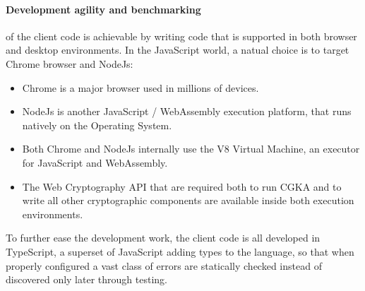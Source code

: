 \paragraph{Development agility and benchmarking} of the client code is achievable by writing code that is supported in both browser and desktop environments.
In the JavaScript world, a natual choice is to target Chrome browser and NodeJs:
\begin{itemize}
    \item Chrome is a major browser used in millions of devices.
    \item NodeJs is another JavaScript / WebAssembly execution platform, that runs natively on the Operating System.
    \item Both Chrome and NodeJs internally use the V8 Virtual Machine, an executor for JavaScript and WebAssembly.
    \item The Web Cryptography API that are required both to run CGKA and to write all other cryptographic components are available inside both execution environments.
\end{itemize}

To further ease the development work, the client code is all developed in TypeScript, a superset of JavaScript adding types to the language, so that when properly configured a vast class of 
errors are statically checked instead of discovered only later through testing.